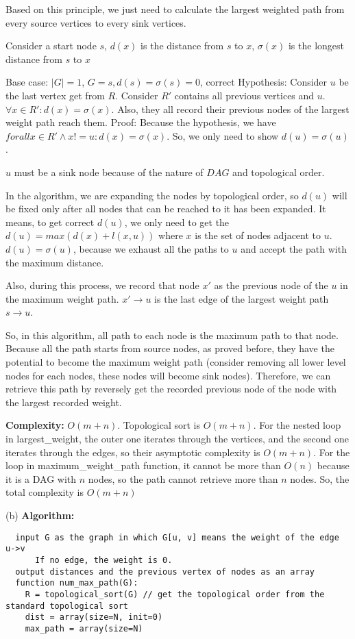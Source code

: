 \documentclass{article}
\begin{document}
\begin{enumerate}[topsep=0pt]
Based on this principle, we just need to calculate the largest weighted path from every source vertices to every sink vertices.

Consider a start node $s$, $d(x)$ is the distance from $s$ to $x$, $\sigma(x)$ is the longest distance from $s$ to $x$

Base case: $|G|=1$, $G={s},d(s)=\sigma(s)=0$, correct
Hypothesis: Consider $u$ be the last vertex get from $R$. Consider $R'$ contains all previous vertices and $u$.
$\forall x\in R':d(x)=\sigma(x)$. Also, they all record their previous nodes of the largest weight path reach them.
Proof: Because the hypothesis, we have $forall x\in R'\wedge x != u:d(x)=\sigma(x)$.
So, we only need to show $d(u)=\sigma(u)$.

$u$ must be a sink node because of the nature of $DAG$ and topological order.

In the algorithm, we are expanding the nodes by topological order, 
so $d(u)$ will be fixed only after all nodes that can be reached to it has been expanded.
It means, to get correct $d(u)$, we only need to get the $d(u)=max(d(x)+l(x,u))$ where $x$ is the set of nodes adjacent to $u$.
$d(u)=\sigma(u)$, because we exhaust all the paths to $u$ and accept the path with the maximum distance.

Also, during this process, we record that node $x'$ as the previous node of the $u$ in the maximum weight path.
$x'\rightarrow u$ is the last edge of the largest weight path $s\rightarrow u$.

So, in this algorithm, all path to each node is the maximum path to that node.
Because all the path starts from source nodes, as proved before, they have the potential to become the maximum weight path 
(consider removing all lower level nodes for each nodes, these nodes will become sink nodes).
Therefore, we can retrieve this path by reversely get the recorded previous node of the node with the largest recorded weight.


\textbf{Complexity:}
$O(m+n)$. Topological sort is $O(m+n)$. For the nested loop in largest\_weight, the outer one iterates through the vertices, and the second one iterates through the edges,
so their asymptotic complexity is $O(m+n)$. For the loop in maximum\_weight\_path function, it cannot be more than $O(n)$ because it is a DAG with $n$ nodes,
so the path cannot retrieve more than $n$ nodes. So, the total complexity is $O(m+n)$
 
(b)
\textbf{Algorithm:}
\begin{verbatim}
  input G as the graph in which G[u, v] means the weight of the edge u->v
      If no edge, the weight is 0.
  output distances and the previous vertex of nodes as an array
  function num_max_path(G):
    R = topological_sort(G) // get the topological order from the standard topological sort
    dist = array(size=N, init=0)
    max_path = array(size=N)


\end{verbatim}
\end{enumerate}
\end{document}
